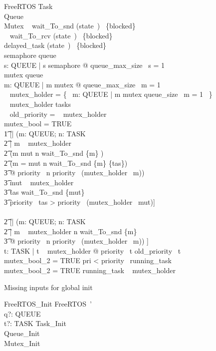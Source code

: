 \begin{schema}{FreeRTOS}
    Task\\
    Queue\\
    Mutex
\where
    \dom~ wait\_To\_snd \subseteq (state~\inv)~ \limg \{blocked\} \rimg\\
    \dom~ wait\_To\_rcv \subseteq (state~\inv)~ \limg \{blocked\} \rimg\\
    delayed\_task \subseteq (state~\inv)~ \limg \{blocked\} \rimg\\
    semaphore \subseteq queue\\
    \forall s: QUEUE | s \in semaphore @ queue\_max\_size~ s = 1\\
    mutex \subseteq queue\\
    \forall m: QUEUE | m \in mutex @ queue\_max\_size~ m = 1\\
    \dom~ mutex\_holder = \{~ m: QUEUE | m \in mutex \land queue\_size~ m = 1 ~\}\\
    \ran~ mutex\_holder \subseteq tasks\\
    \dom~ old\_priority = \ran~ mutex\_holder\\
    \IF mutex\_bool = TRUE \THEN \\
    \t1  [| (\forall m: QUEUE; n: TASK\\
    \t2     | m \in \dom~ mutex\_holder\\
    \t2     \land (m \neq mut \implies n \in wait\_To\_snd \inv \limg \{m\} \rimg)\\
    \t2     \land (m = mut \implies n \in wait\_To\_snd \inv \limg \{m\} \rimg \setminus \{tas\})\\
    \t3         @ priority~ n \leq priority~ (mutex\_holder~ m)) \\
    \t3     \land mut \in \dom~ mutex\_holder\\
    \t3     \land tas \in wait\_To\_snd \inv \limg \{mut\} \rimg\\
    \t3     \land priority~ tas > priority~ (mutex\_holder~ mut)] \\
    \ELSE \\
    \t2   [| (\forall m: QUEUE; n: TASK\\
    \t2     | m \in \dom~ mutex\_holder \land n \in wait\_To\_snd \inv \limg \{m\} \rimg\\
    \t3         @ priority~ n \leq priority~ (mutex\_holder~ m)) ]\\
    \forall t: TASK | t \in \ran~ mutex\_holder @ priority~ t \geq old\_priority~ t\\
    mutex\_bool\_2 = TRUE \implies pri < priority~ running\_task\\
    mutex\_bool\_2 = TRUE \implies running\_task \notin \ran~ mutex\_holder
\end{schema}

Missing inputs for global init
\begin{schema}{FreeRTOS\_Init}
	FreeRTOS~' \\
	q?: QUEUE \\
	t?: TASK
\where
    Task\_Init \\
    Queue\_Init \\
    Mutex\_Init
\end{schema}
